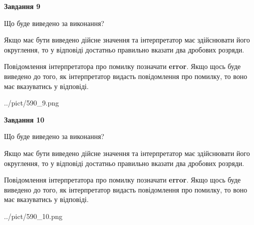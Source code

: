 \documentclass[12pt, ukrainian]{article}
\begin{document}
{\begin {Large}
{\begin {center}\textbf{Завдання 9}\end {center}}\par
Що буде виведено за виконання? \par

Якщо має бути виведено дійсне значення та інтерпретатор має здійснювати його округлення, 
то у відповіді достатньо правильно вказати два дробових розряди.

Повідомлення інтерпретатора про помилку позначати \textbf{error}.
Якщо щось буде виведено до того, як інтерпретатор видасть повідомлення про помилку, 
то воно має вказуватись у відповіді. \par

\begin{center}
	{../pict/590_9.png}
\end{center}
\newpage

{\begin {center}\textbf{Завдання 10}\end {center}}\par
Що буде виведено за виконання? \par

Якщо має бути виведено дійсне значення та інтерпретатор має здійснювати його округлення, 
то у відповіді достатньо правильно вказати два дробових розряди.

Повідомлення інтерпретатора про помилку позначати \textbf{error}.
Якщо щось буде виведено до того, як інтерпретатор видасть повідомлення про помилку, 
то воно має вказуватись у відповіді. \par

\begin{center}
	{../pict/590_10.png}
\end{center}
\newpage

\end {Large}}
\end{document}
